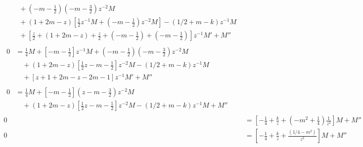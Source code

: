 \documentclass[a4paper,10pt, leqno, answers]{exam}  %
\begin{document}
\begin{questions}
\begin{solution}
\begin{align*}
\begin{split}
                &\quad {}+ \left( -m - \frac{1}{2} \right) \left( -m - \frac{3}{2} \right) z^{-2} M  \\
                &\quad {}+ (1 + 2 m - z) \left[ \frac{1}{2} z^{-1} M + \left( -m - \frac{1}{2} \right) z^{-2} M \right] - (1/2 + m - k) z^{-1} M \\
                &\quad {}+ \left[ \frac{z}{2} + (1 + 2 m - z) + \frac{z}{2} + \left( -m - \frac{1}{2} \right) + \left( -m - \frac{1}{2} \right) \right] z^{-1} M' + M''
            \end{split} \\
            \begin{split}
                0 &= \frac{1}{4} M + \left[ -m - \frac{1}{2} \right] z^{-1} M + \left( -m - \frac{1}{2} \right) \left( -m - \frac{3}{2} \right) z^{-2} M  \\
                &\quad {}+ (1 + 2 m - z) \left[ \frac{1}{2} z - m - \frac{1}{2} \right] z^{-2} M - (1/2 + m - k) z^{-1} M \\
                &\quad {}+ \left[ z + 1 + 2 m - z - 2m - 1 \right] z^{-1} M' + M''
            \end{split} \\
            \begin{split}
                0 &= \frac{1}{4} M + \left[ -m - \frac{1}{2} \right] \left( z - m - \frac{3}{2} \right) z^{-2} M  \\
                &\quad {}+ (1 + 2 m - z) \left[ \frac{1}{2} z - m - \frac{1}{2} \right] z^{-2} M - (1/2 + m - k) z^{-1} M + M''
            \end{split} \\
            0 &= \left[ -\frac{1}{4} + \frac{k}{z} + \left( -m^2 + \frac{1}{4} \right) \frac{1}{z^2} \right] M + M'' \\
            0 &= \left[ -\frac{1}{4} + \frac{k}{z} + \frac{(1/4 - m^2)}{z^2} \right] M + M'' \\
        \end{align*}
    \end{solution}


\end{questions}
\end{document}
